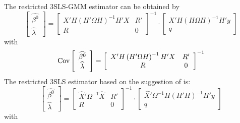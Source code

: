 The restricted 3SLS-GMM estimator can be obtained by
\begin{equation}
   \left[ \begin{array}{c}
      \widehat{\beta^0} \\ \widehat{\lambda}
   \end{array} \right]
   =
   \left[ \begin{array}{cc}
      X' H \left( H' \Omega H \right)^{-1} H' X & R' \\ 
      R & 0
   \end{array} \right]^{-1}
   \cdot
   \left[ \begin{array}{c}
      X' H \left( H \Omega H \right)^{-1} H' y \\ q 
   \end{array} \right]
   \label{eq:3slsGmmR}
\end{equation}
with
\begin{equation}
   \text{Cov} 
   \left[ \begin{array}{c}
      \widehat{\beta^0} \\ \widehat{\lambda}
   \end{array} \right] 
   = 
   \left[ \begin{array}{cc}
      X' H \left( H' \Omega H \right)^{-1} H' X & R' \\ 
      R & 0
   \end{array} \right]^{-1}
\end{equation}
The restricted 3SLS estimator based on the suggestion of
\cite{schmidt90} is:
\begin{equation}
   \left[ \begin{array}{c}
      \widehat{\beta^0} \\ \widehat{\lambda}
   \end{array} \right]
   =
   \left[ \begin{array}{cc}
      \widehat{X}' \Omega^{-1} \widehat{X} & R' \\ 
      R & 0
   \end{array} \right]^{-1}
   \cdot
   \left[ \begin{array}{c}
      \widehat{X}' \Omega^{-1} H \left( H' H \right)^{-1} H' y \\ q 
   \end{array} \right]
   \label{eq:3slsSchmidtR}
\end{equation}
with
